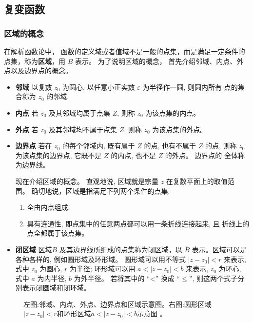 
\subsection{复变函数}
\label{sub:complexfunctions}


\subsubsection{区域的概念}
\label{subsub:domain}
在解析函数论中， 函数的定义域或者值域不是一般的点集，而是满足一定条件的点集，称为{\bf 区域}，用 $B$ 表示。
为了说明区域的概念， 首先介绍邻域、内点、外点以及边界点的概念。
\begin{itemize}
\item {\bf 邻域} \quad 以复数 $z_0$ 为圆心, 以任意小正实数 $\varepsilon$ 为半径作一圆, 则圆内所有 点的集合称为 $z_0$ 的邻域.
\item {\bf 内点} \quad 若 $z_0$ 及其邻域均属于点集 $Z$, 则称 $z_0$ 为该点集的内点。
\item {\bf 外点} \quad 若 $z_0$ 及其邻域均不属于点集 $Z$, 则称 $z_0$ 为该点集的外点。
\item {\bf 边界点}  \quad 若在 $z_0$ 的每个邻域内, 既有属于 $Z$ 的点, 也有不属于 $Z$ 的点, 则称 $z_0$ 为该点集的边界点, 它既不是 $Z$ 的内点, 也不是 $Z$ 的外点。 边界点的 全体称为边界线。

现在介绍区域的概念。 直观地说, 区域就是宗量 $z$ 在复数平面上的取值范 围。 确切地说，区域是指满足下列两个条件的点集:
    \begin{enumerate}
        \item 全由内点组成;
        \item 具有连通性, 即点集中的任意两点都可以用一条折线连接起来, 且 折线上的点全都属于该点集。
    \end{enumerate}
\item {\bf 闭区域} 区域$B$ 及其边界线所组成的点集称为闭区域，以 $\bar{B}$ 表示。区域可以是各种各样的, 例如圆形域及环形域。 
圆形域可以用不等式 $\left|z-z_0\right|<r$ 来表示, 式中 $z_0$ 为圆心, $r$ 为半径; 
环形域可以用 $a<\left|z-z_0\right|<b$ 来表示, $z_0$ 为环心, 式中 $a$ 为内半径, $b$ 为外半径。
 若将其中的 “<” 换成 $“ \leqslant ”$, 则这两个式子分别表示闭圆域和闭环域。
\end{itemize}

\begin{figure}
    \centering
    
    \quad
    
    \caption{左图:邻域、内点、外点、边界点和区域示意图。右图:圆形区域$\left|z-z_0\right|<r$和环形区域$a<\left|z-z_0\right|<b$示意图 。}
\end{figure}



